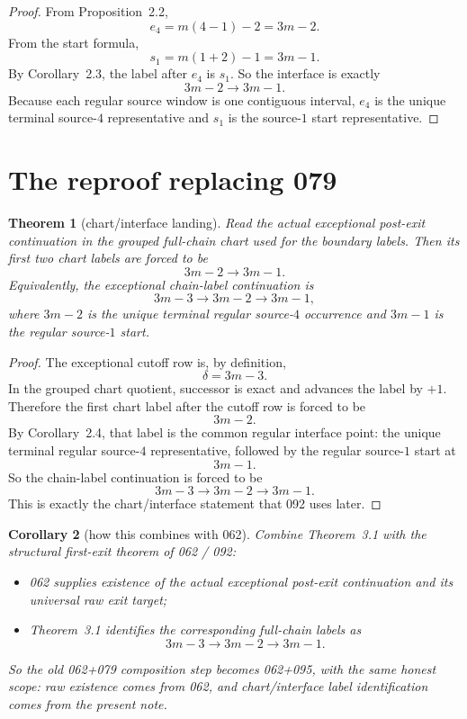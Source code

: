 \documentclass[11pt]{article}
\newtheorem{theorem}{Theorem}[section]
\newtheorem{corollary}[theorem]{Corollary}
\begin{document}
\begin{proof}
From Proposition~2.2,
\[
e_4 = m(4-1)-2 = 3m-2.
\]
From the start formula,
\[
s_1 = m(1+2)-1 = 3m-1.
\]
By Corollary~2.3, the label after $e_4$ is $s_1$. So the interface is exactly
\[
3m-2 \to 3m-1.
\]
Because each regular source window is one contiguous interval, $e_4$ is the
unique terminal source-$4$ representative and $s_1$ is the source-$1$ start
representative.
\end{proof}

\section{The reproof replacing 079}

\begin{theorem}[chart/interface landing]
Read the actual exceptional post-exit continuation in the grouped full-chain
chart used for the boundary labels. Then its first two chart labels are forced
to be
\[
3m-2 \to 3m-1.
\]
Equivalently, the exceptional chain-label continuation is
\[
3m-3 \to 3m-2 \to 3m-1,
\]
where $3m-2$ is the unique terminal regular source-$4$ occurrence and $3m-1$
is the regular source-$1$ start.
\end{theorem}

\begin{proof}
The exceptional cutoff row is, by definition,
\[
\delta = 3m-3.
\]
In the grouped chart quotient, successor is exact and advances the label by
$+1$. Therefore the first chart label after the cutoff row is forced to be
\[
3m-2.
\]
By Corollary~2.4, that label is the common regular interface point: the unique
terminal regular source-$4$ representative, followed by the regular source-$1$
start at
\[
3m-1.
\]
So the chain-label continuation is forced to be
\[
3m-3 \to 3m-2 \to 3m-1.
\]
This is exactly the chart/interface statement that 092 uses later.
\end{proof}

\begin{corollary}[how this combines with 062]
Combine Theorem~3.1 with the structural first-exit theorem of 062 / 092:
\begin{itemize}[leftmargin=2em]
\item 062 supplies existence of the actual exceptional post-exit continuation
      and its universal raw exit target;
\item Theorem~3.1 identifies the corresponding full-chain labels as
      \[
      3m-3 \to 3m-2 \to 3m-1.
      \]
\end{itemize}
So the old 062+079 composition step becomes 062+095, with the same honest
scope: raw existence comes from 062, and chart/interface label identification
comes from the present note.
\end{corollary}
\end{document}
